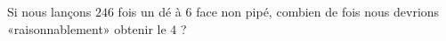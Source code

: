 
\begin{exercice}\label{exoPremiere-0076}

    Si nous lançons \( 246\) fois un dé à \( 6\) face non pipé, combien de fois nous devrions «raisonnablement» obtenir le \( 4\) ?

\end{exercice}
